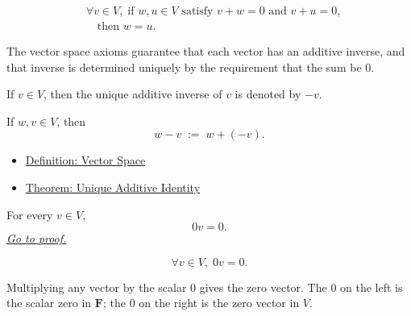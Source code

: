 \begin{remark*}
\[
\begin{aligned}
&\forall v \in V,\;
\text{if } w,u \in V \text{ satisfy } v+w=0 \text{ and } v+u=0, \\
&\quad\text{then } w=u.
\end{aligned}
\]
\end{remark*}

\begin{remark*}[Interpretation]
The vector space axioms guarantee that each vector has an additive inverse,
and that inverse is determined uniquely by the requirement that the sum be $0$.
\end{remark*}

\begin{remark*}[Notation]
If $v \in V$, then the unique additive inverse of $v$ is denoted by $-v$.

If $w,v \in V$, then
\[
w-v
\;:=\;
w+(-v).
\]
\end{remark*}

\begin{remark*}[Dependencies]
\begin{itemize}
  \item \hyperref[def:vector-space]{Definition: Vector Space}
  \item \hyperref[thm:unique-additive-identity]{Theorem: Unique Additive Identity}
\end{itemize}
\end{remark*}


\begin{tcolorbox}[colback=thmbox, colframe=thmborder, arc=2pt,
  left=6pt, right=6pt, top=4pt, bottom=4pt,
  title={\small\textbf{Theorem ($0v=0$)}},
  fonttitle=\small\bfseries]
\begin{theorem}[$0v=0$]
\label{thm:zero-scalar-times-vector}
For every $v \in V$,
\[
0v=0.
\]
\hyperref[prf:zero-scalar-times-vector]{\textit{Go to proof.}}
\end{theorem}
\end{tcolorbox}

\begin{remark*}
\[
\forall v \in V,\; 0v=0.
\]
\end{remark*}

\begin{remark*}[Interpretation]
Multiplying any vector by the scalar $0$ gives the zero vector. The $0$ on the
left is the scalar zero in $\mathbf{F}$; the $0$ on the right is the zero vector
in $V$.
\end{remark*}

